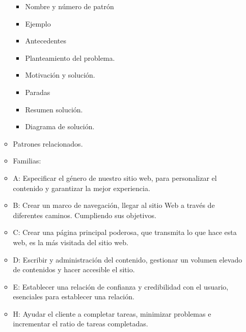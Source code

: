 \documentclass[12pt, twoside, openright]{report} %
\begin{document}
\begin{itemize}
\begin{itemize}
		            \begin{itemize}
			            \item Nombre y número de patrón

			            \item Ejemplo

			            \item Antecedentes

			            \item Planteamiento del problema.

			            \item Motivación y solución.

			            \item Paradas

			            \item Resumen solución.

			            \item Diagrama de solución.
		            \end{itemize}

		      \item Patrones relacionados.

		      \item Familias:

		      \item A: Especificar el género de nuestro sitio web, para
		            personalizar el contenido y garantizar la mejor experiencia.

		      \item B: Crear un marco de navegación, llegar al sitio Web a través
		            de diferentes caminos. Cumpliendo sus objetivos.

		      \item C: Crear una página principal poderosa, que transmita lo que
		            hace esta web, es la más visitada del sitio web.

		      \item D: Escribir y administración del contenido, gestionar un
		            volumen elevado de contenidos y hacer accesible el sitio.

		      \item E: Establecer una relación de confianza y credibilidad con el
		            usuario, esenciales para establecer una relación.

		      \item H: Ayudar el cliente a completar tareas, minimizar problemas e
		            incrementar el ratio de tareas completadas.


\end{itemize}
\end{itemize}
\end{document}
